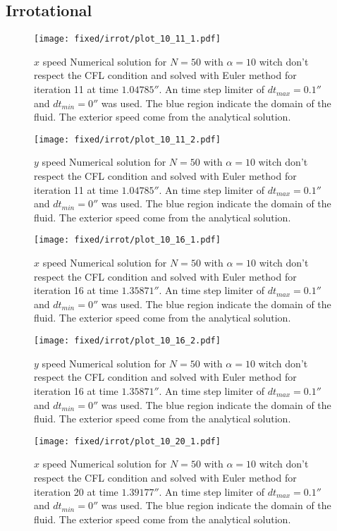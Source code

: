 \subsection{Irrotational}

\begin{figure}
\texttt{[image: fixed/irrot/plot\_10\_11\_1.pdf]}
\caption{$x$ speed Numerical solution for $N=50$ with $\alpha=10$ witch don't respect the CFL condition and solved with Euler method
for iteration 11 at time $\unit{1.04785}{\second}$.
An time step limiter of $dt_{max}=\unit{0.1}{\second}$ and $dt_{min}=\unit{0}{\second}$ was used.
The blue region indicate the domain of the fluid. The exterior speed come from the analytical solution.
}
\end{figure}

\begin{figure}
\texttt{[image: fixed/irrot/plot\_10\_11\_2.pdf]}
\caption{$y$ speed Numerical solution for $N=50$ with $\alpha=10$ witch don't respect the CFL condition and solved with Euler method
for iteration 11 at time $\unit{1.04785}{\second}$.
An time step limiter of $dt_{max}=\unit{0.1}{\second}$ and $dt_{min}=\unit{0}{\second}$ was used.
The blue region indicate the domain of the fluid. The exterior speed come from the analytical solution.
}
\end{figure}

\begin{figure}
\texttt{[image: fixed/irrot/plot\_10\_16\_1.pdf]}
\caption{$x$ speed Numerical solution for $N=50$ with $\alpha=10$ witch don't respect the CFL condition and solved with Euler method
for iteration 16 at time $\unit{1.35871}{\second}$.
An time step limiter of $dt_{max}=\unit{0.1}{\second}$ and $dt_{min}=\unit{0}{\second}$ was used.
The blue region indicate the domain of the fluid. The exterior speed come from the analytical solution.
}
\end{figure}

\begin{figure}
\texttt{[image: fixed/irrot/plot\_10\_16\_2.pdf]}
\caption{$y$ speed Numerical solution for $N=50$ with $\alpha=10$ witch don't respect the CFL condition and solved with Euler method
for iteration 16 at time $\unit{1.35871}{\second}$.
An time step limiter of $dt_{max}=\unit{0.1}{\second}$ and $dt_{min}=\unit{0}{\second}$ was used.
The blue region indicate the domain of the fluid. The exterior speed come from the analytical solution.
}
\end{figure}

\begin{figure}
\texttt{[image: fixed/irrot/plot\_10\_20\_1.pdf]}
\caption{$x$ speed Numerical solution for $N=50$ with $\alpha=10$ witch don't respect the CFL condition and solved with Euler method
for iteration 20 at time $\unit{1.39177}{\second}$.
An time step limiter of $dt_{max}=\unit{0.1}{\second}$ and $dt_{min}=\unit{0}{\second}$ was used.
The blue region indicate the domain of the fluid. The exterior speed come from the analytical solution.
}
\end{figure}


